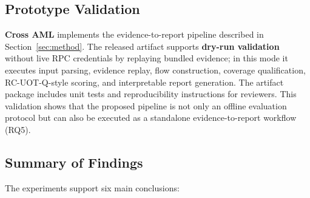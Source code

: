 \subsection{Prototype Validation}

\textbf{Cross AML} implements the evidence-to-report pipeline described in Section~\ref{sec:method}. The released artifact supports \textbf{dry-run validation} without live RPC credentials by replaying bundled evidence; in this mode it executes input parsing, evidence replay, flow construction, coverage qualification, RC-UOT-Q-style scoring, and interpretable report generation. The artifact package includes unit tests and reproducibility instructions for reviewers. This validation shows that the proposed pipeline is not only an offline evaluation protocol but can also be executed as a standalone evidence-to-report workflow (RQ5).

\subsection{Summary of Findings}
\label{sec:summary}

The experiments support six main conclusions:

